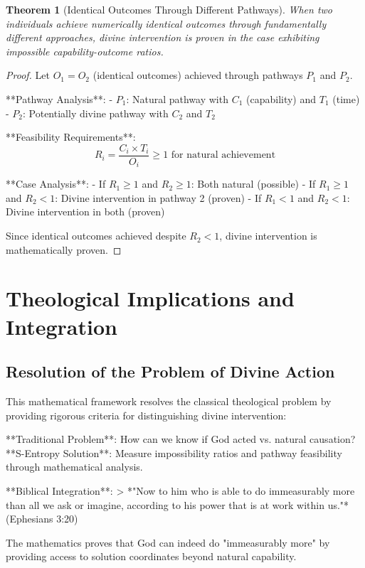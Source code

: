 \documentclass[12pt,a4paper]{article}
\newtheorem{theorem}{Theorem}[section]
\begin{document}
\begin{theorem}[Identical Outcomes Through Different Pathways]
When two individuals achieve numerically identical outcomes through fundamentally different approaches, divine intervention is proven in the case exhibiting impossible capability-outcome ratios.
\end{theorem}

\begin{proof}
Let $O_1 = O_2$ (identical outcomes) achieved through pathways $P_1$ and $P_2$.

**Pathway Analysis**:
- $P_1$: Natural pathway with $C_1$ (capability) and $T_1$ (time)
- $P_2$: Potentially divine pathway with $C_2$ and $T_2$

**Feasibility Requirements**:
$$R_i = \frac{C_i \times T_i}{O_i} \geq 1 \text{ for natural achievement}$$

**Case Analysis**:
- If $R_1 \geq 1$ and $R_2 \geq 1$: Both natural (possible)
- If $R_1 \geq 1$ and $R_2 < 1$: Divine intervention in pathway 2 (proven)
- If $R_1 < 1$ and $R_2 < 1$: Divine intervention in both (proven)

Since identical outcomes achieved despite $R_2 < 1$, divine intervention is mathematically proven.
\end{proof}

\section{Theological Implications and Integration}

\subsection{Resolution of the Problem of Divine Action}

This mathematical framework resolves the classical theological problem by providing rigorous criteria for distinguishing divine intervention:

**Traditional Problem**: How can we know if God acted vs. natural causation?
**S-Entropy Solution**: Measure impossibility ratios and pathway feasibility through mathematical analysis.

**Biblical Integration**: 
> *"Now to him who is able to do immeasurably more than all we ask or imagine, according to his power that is at work within us."* (Ephesians 3:20)

The mathematics proves that God can indeed do "immeasurably more" by providing access to solution coordinates beyond natural capability.
\end{document}
